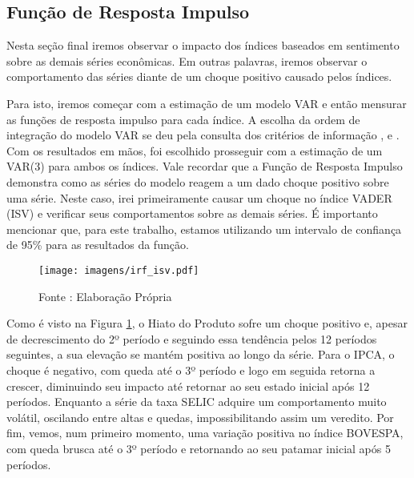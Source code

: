 \subsection{Função de Resposta Impulso}

Nesta seção final iremos observar o impacto dos índices baseados em sentimento sobre as demais séries econômicas. Em outras palavras, iremos observar o comportamento das séries diante de um choque positivo causado pelos índices.

Para isto, iremos começar com a estimação de um modelo VAR e então mensurar as funções de resposta impulso para cada índice. A escolha da ordem de integração do modelo VAR se deu pela consulta dos critérios de informação ,  e . Com os resultados em mãos, foi escolhido prosseguir com a estimação de um VAR(3) para ambos os índices. Vale recordar que a Função de Resposta Impulso demonstra como as séries do modelo reagem a um dado choque positivo sobre uma série. Neste caso, irei primeiramente causar um choque no índice VADER (ISV) e verificar seus comportamentos sobre as demais séries. É importanto mencionar que, para este trabalho, estamos utilizando um intervalo de confiança de 95\% para as resultados da função.

\begin{figure}[!h]
    \centering
    \caption{Função de Resposta ao Impulso para o Modelo 1 - ISV}
    \label{fig: irf_isv}
    \texttt{[image: imagens/irf\_isv.pdf]}
    \caption*{Fonte : Elaboração Própria}
\end{figure}

Como é visto na Figura \ref{fig: irf_isv}, o Hiato do Produto sofre um choque positivo e, apesar de decrescimento do 2º período e seguindo essa tendência pelos 12 períodos seguintes, a sua elevação se mantém positiva ao longo da série. Para o IPCA, o choque é negativo, com queda até o 3º período e logo em seguida retorna a crescer, diminuindo seu impacto até retornar ao seu estado inicial após 12 períodos. Enquanto a série da taxa SELIC adquire um comportamento muito volátil, oscilando entre altas e quedas, impossibilitando assim um veredito. Por fim, vemos, num primeiro momento, uma variação positiva no índice BOVESPA, com queda brusca até o 3º período e retornando ao seu patamar inicial após 5 períodos. 

